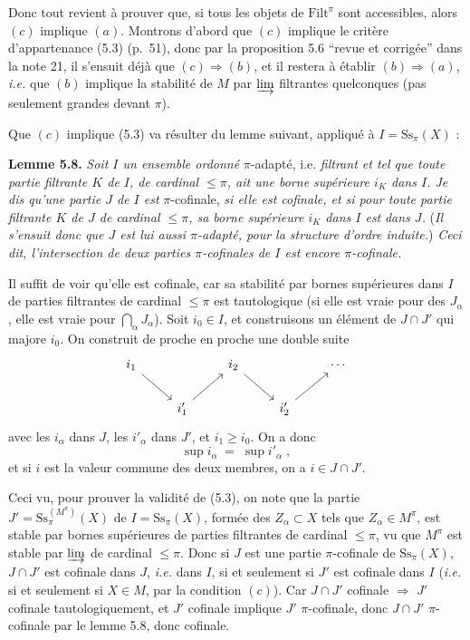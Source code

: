 \documentclass[11pt]{article}
\newcommand{\printedpage}[1]{\marginpar{\footnotesize p.~#1}}
\newcommand{\msp}[1]{\marginpar{\footnotesize [#1]}}
\newcommand{\Filt}{\mathrm{Filt}}
\newcommand{\Ss}{\mathrm{Ss}}
\begin{document}
Donc tout revient à prouver que, si tous les objets de $\Filt^\pi$ sont accessibles, alors $(c)$ implique $(a)$. Montrons d'abord que $(c)$ implique le critère d'appartenance (5.3) (p.~51), donc par la proposition 5.6 “revue et corrigée” dans la note 21, il s'ensuit déjà que $(c) \Longrightarrow (b)$, et il restera à établir $(b) \Longrightarrow (a)$, \textit{i.e.} que $(b)$ implique la stabilité de $M$ par $\varinjlim$ filtrantes quelconques (pas seulement grandes devant $\pi$).

Que $(c)$ implique (5.3) va résulter du lemme suivant, appliqué à $I = \Ss_\pi(X)$ :

\textbf{Lemme 5.8.} \textit{Soit $I$ un ensemble ordonné} $\pi$-adapté, i.e. \textit{filtrant et tel que toute partie filtrante $K$ de $I$, de cardinal $\leq \pi$, ait une borne supérieure $i_K$ dans $I$. Je dis qu'une partie $J$ de $I$ est} $\pi$-cofinale, \textit{si elle est cofinale, et si pour toute partie filtrante $K$ de $J$ de cardinal $\leq \pi$, sa borne supérieure $i_K$ dans $I$ est}
\printedpage{36}
\msp{page 60}
\textit{dans $J$.} (\textit{Il s'ensuit donc que $J$ est lui aussi $\pi$-adapté, pour la structure d'ordre induite.}) \textit{Ceci dit, l'intersection de deux parties $\pi$-cofinales de $I$ est encore $\pi$-cofinale.}

Il suffit de voir qu'elle est cofinale, car sa stabilité par bornes supérieures dans $I$ de parties filtrantes de cardinal $\leq \pi$ est tautologique (si elle est vraie pour des $J_\alpha$, elle est vraie pour $\bigcap_\alpha J_\alpha$). Soit $i_0 \in I$, et construisons un élément de $J \cap J'$ qui majore $i_0$. On construit de proche en proche une double suite
\[
\begin{tikzcd}
i_1 \arrow[dr] & & i_2 \arrow[dr] & & \cdots \\
& i'_1 \arrow[ur] & & i'_2 \arrow[ur] &
\end{tikzcd}
\]
avec les $i_\alpha$ dans $J$, les $i'_\alpha$ dans $J'$, et $i_1 \geq i_0$. On a donc
\[
\sup i_\alpha \;=\; \sup i'_\alpha \;,
\]
et si $i$ est la valeur commune des deux membres, on a $i \in J \cap J'$.

Ceci vu, pour prouver la validité de (5.3), on note que la partie $J' = \Ss_\pi^{(M^\pi)}(X)$ de $I = \Ss_\pi(X)$, formée des $Z_\alpha \subset X$ tels que $Z_\alpha \in M^\pi$, est stable par bornes supérieures de parties filtrantes de cardinal $\leq \pi$, vu que $M^\pi$ est stable
\msp{page 61}
par $\varinjlim$ de cardinal $\leq \pi$. Donc si $J$ est une partie $\pi$-cofinale de $\Ss_\pi(X)$, $J \cap J'$ est cofinale dans $J$, \textit{i.e.} dans $I$, si et seulement si $J'$ est cofinale dans $I$ (\textit{i.e.} si et seulement si $X \in M$, par la condition $(c)$). Car $J \cap J'$ cofinale $\Longrightarrow$ $J'$ cofinale tautologiquement, et $J'$ cofinale implique $J'$ $\pi$-cofinale, donc $J \cap J'$ $\pi$-cofinale par le lemme 5.8, donc cofinale.
\end{document}
